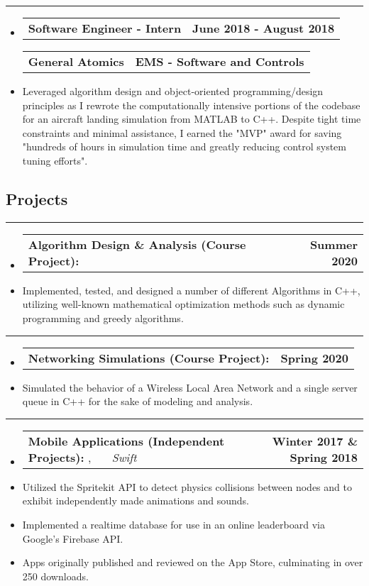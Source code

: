\documentclass[10pt,letterpaper]{article}
\makeatletter
\newcommand{\header}[2]
{
	\begin{tabular*}{\linewidth}{l @{\extracolsep{\fill}} r}
		\hspace{-27pt} #1 & #2 \\
	\end{tabular*}
}
\newcommand{\sectionbreak}
{
	\vspace{-1.2em}
	\rule{\textwidth}{1.7pt}
	\vspace{-1.7em}
}
\makeatother
\begin{document}
\hrule

\begin{itemize}
	\item[]
		\header
		{\textbf{Software Engineer - Intern}} 
		{\textbf{June 2018 - August 2018}}
		\header
		{\textbf{General Atomics}}
		{\textbf{EMS - Software and Controls}} 
	\item
		Leveraged algorithm design and object-oriented programming/design principles as I rewrote the computationally intensive portions of the codebase for an aircraft landing simulation from MATLAB to C++. Despite tight time constraints and minimal assistance, I earned the "MVP" award for saving "hundreds of hours in simulation time and greatly reducing control system tuning efforts".


\end{itemize}

\vspace{-1.5em}

\subsection*{Projects}
\sectionbreak


\begin{itemize}
	\item[]
		\header
		{
			\textbf{Algorithm Design \& Analysis (Course Project): }
		}
		{\textbf{Summer 2020}}
	\item 
		Implemented, tested, and designed a number of different Algorithms in C++, utilizing well-known mathematical optimization methods such as dynamic programming and greedy algorithms. 

\end{itemize}

\hrule

\begin{itemize}
\item[]
	\header
	{
		\textbf{Networking Simulations (Course Project): }
	}
	{\textbf{Spring 2020}}
\item 
	Simulated the behavior of a Wireless Local Area Network and a single server queue in C++ for the sake of modeling and analysis. 
\end{itemize}

\hrule

\begin{itemize}
	\item[]
		\header
		{
			\textbf{Mobile Applications (Independent Projects): }
			\href{https://appadvice.com/app/round-bound/1369632746}{\emph{\underline{\smash{Round 'a Bound}}}}, 
			\href{https://appadvice.com/app/tic-tac-emoji/1346934986}{\emph{\underline{\smash{Tic-Tac Emoji}}}} \ \ \ \footnotesize  \emph{Swift}
		}
		{\textbf{Winter 2017 \& Spring 2018}}
	\item 
		Utilized the Spritekit API to detect physics collisions between nodes and to exhibit independently made animations and sounds.
	\item
		Implemented a realtime database for use in an online leaderboard via Google's Firebase API.
	\item
		Apps originally published and reviewed on the App Store, culminating in over 250 downloads.
\end{itemize}
\end{document}
